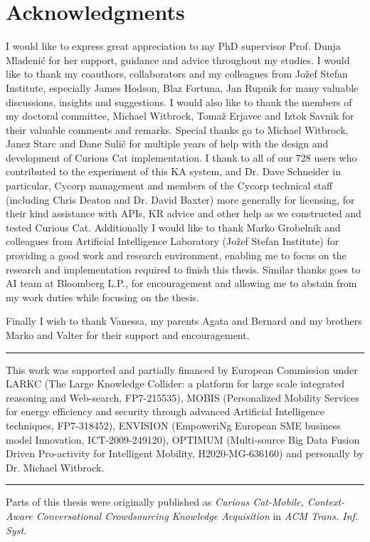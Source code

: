 % 
\chapter*{Acknowledgments}
I would like to express great appreciation to my PhD supervisor Prof. Dunja 
Mladenić for her support, guidance and advice throughout my studies. 
I would like to thank my coauthors, collaborators and
my colleagues from Jožef Stefan Institute, especially James Hodson, Blaz Fortuna, Jan Rupnik for many valuable discussions, 
insights and suggestions. 
I would also like to thank the members of my doctoral committee, 
Michael Witbrock, Tomaž Erjavec and Iztok Savnik for their valuable comments and
remarks. 
Special thanks go to Michael Witbrock, Janez Starc and Dane Sulič for
multiple years of help with the design and development of Curious Cat 
implementation. I thank to all of our 728 users who contributed 
to the experiment of this KA system, and Dr. Dave Schneider in particular, 
Cycorp management and members of the Cycorp technical staff (including Chris 
Deaton and Dr. David Baxter) more generally for licensing, for their kind 
assistance with APIs, KR advice and other help as we constructed and 
tested Curious Cat.
Additionally I would like to thank Marko Grobelnik and colleagues from
Artificial Intelligence Laboratory (Jožef Stefan Institute) for providing a 
good work and research environment, enabling me to focus on the research and
implementation required to finish this thesis. Similar thanks goes to AI team
at Bloomberg L.P., for encouragement and allowing me to abstain from my work
duties while focusing on the thesis.

Finally I wish to thank Vanessa, my parents Agata and Bernard and my brothers
Marko and Valter for their support and encouragement.

\rule{0.5\textwidth}{.4pt}

This work was supported and partially financed by European Commission under
LARKC (The Large Knowledge Collider: a platform for large scale integrated
reasoning and Web-search, FP7-215535), MOBIS (Personalized Mobility Services 
for energy efficiency and security through advanced Artificial Intelligence 
techniques, FP7-318452), ENVISION (EmpoweriNg European SME business model 
Innovation, ICT-2009-249120), OPTIMUM (Multi-source Big Data Fusion Driven 
Pro-activity for Intelligent Mobility, H2020-MG-636160) and personally by 
Dr. Michael Witbrock.

\rule{0.5\textwidth}{.4pt}

Parts of this thesis were originally published as \emph{Curious Cat-Mobile, 
	Context-Aware Conversational Crowdsourcing Knowledge Acquisition} in 
\emph{ACM Trans. Inf. Syst.}